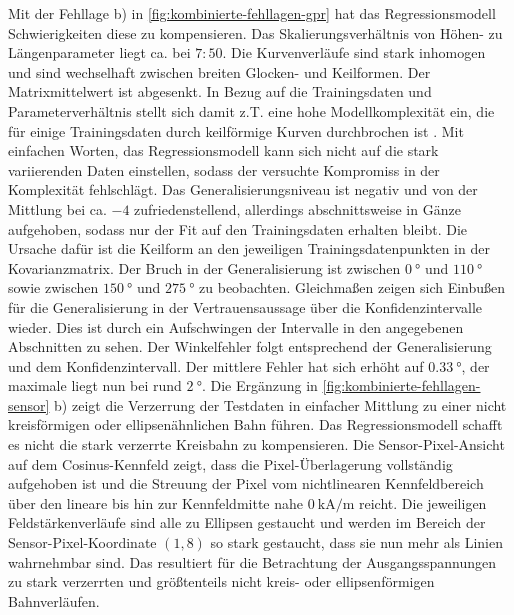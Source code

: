 Mit der Fehllage b) in \autoref{fig:kombinierte-fehllagen-gpr} hat das Regressionsmodell Schwierigkeiten diese zu kompensieren. Das Skalierungsverhältnis von Höhen- zu Längenparameter liegt ca. bei $7:50$. Die Kurvenverläufe sind stark inhomogen und  sind wechselhaft zwischen breiten Glocken- und Keilformen. Der Matrixmittelwert ist abgesenkt. In Bezug auf die Trainingsdaten und Parameterverhältnis stellt sich damit z.T. eine hohe Modellkomplexität ein, die für einige Trainingsdaten durch keilförmige Kurven durchbrochen ist  \cite{Rasmussen2006}. Mit einfachen Worten, das Regressionsmodell kann sich nicht auf die stark variierenden Daten einstellen, sodass der versuchte Kompromiss in der Komplexität fehlschlägt. Das Generalisierungsniveau ist negativ und von der Mittlung bei ca. $-4$ zufriedenstellend, allerdings abschnittsweise in Gänze aufgehoben, sodass nur der Fit auf den Trainingsdaten erhalten bleibt. Die Ursache dafür ist die Keilform an den jeweiligen Trainingsdatenpunkten in der Kovarianzmatrix. Der Bruch in der Generalisierung ist zwischen $\SI{0}{\degree}$ und $\SI{110}{\degree}$ sowie zwischen $\SI{150}{\degree}$ und $\SI{275}{\degree}$ zu beobachten. Gleichmaßen zeigen sich Einbußen für die Generalisierung in der Vertrauensaussage über die Konfidenzintervalle wieder. Dies ist durch ein Aufschwingen der Intervalle in den angegebenen Abschnitten zu sehen. Der Winkelfehler folgt entsprechend der Generalisierung und dem Konfidenzintervall. Der mittlere Fehler hat sich erhöht auf $\SI{0,33}{\degree}$, der maximale liegt nun bei rund $\SI{2}{\degree}$. Die Ergänzung in \autoref{fig:kombinierte-fehllagen-sensor} b) zeigt die Verzerrung der Testdaten in einfacher Mittlung zu einer nicht kreisförmigen oder ellipsenähnlichen Bahn führen. Das Regressionsmodell schafft es nicht die stark verzerrte Kreisbahn zu kompensieren. Die Sensor-Pixel-Ansicht auf dem Cosinus-Kennfeld zeigt, dass die Pixel-Überlagerung vollständig aufgehoben ist und die Streuung der Pixel vom nichtlinearen Kennfeldbereich über den lineare bis hin zur Kennfeldmitte nahe $\SI{0}{\kilo\ampere\per\metre}$ reicht. Die jeweiligen Feldstärkenverläufe sind alle zu Ellipsen gestaucht und werden im Bereich der Sensor-Pixel-Koordinate $(1,8)$ so stark gestaucht, dass sie nun mehr als Linien wahrnehmbar sind. Das resultiert für die Betrachtung der Ausgangsspannungen zu stark verzerrten und größtenteils nicht kreis- oder ellipsenförmigen Bahnverläufen.


